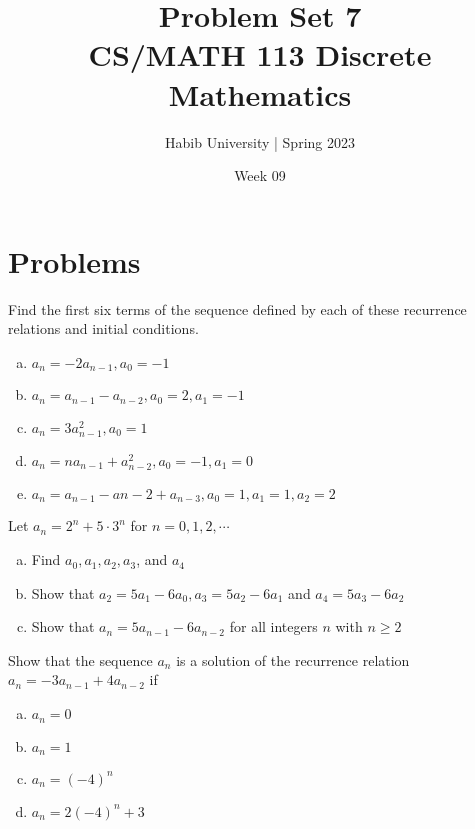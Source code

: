 \documentclass{article}
\newenvironment{problem}[2][Problem]{\begin{trivlist}
\item[\hskip \labelsep {\bfseries #1}\hskip \labelsep {\bfseries #2.}]}{\end{trivlist}}
\begin{document}
\title{Problem Set 7\\CS/MATH 113 Discrete Mathematics}
\author{Habib University | Spring 2023}
\date{Week 09}
\maketitle

\section{Problems}

\begin{problem}{1}[Chapter 2.4, Question 10 ]
    Find the first six terms of the sequence defined by each of these recurrence relations and initial conditions.
    \begin{enumerate}[(a)]
        \item $a_n = -2a_{n-1}, a_0 = -1 $
        \item $ a_n = a_{n-1} - a_{n-2}, a_0 = 2, a_1 = -1$
        \item $a_n = 3a_{n-1}^{2}, a_0 = 1 $
        \item $a_n = na_{n-1} + a_{n-2}^2, a_0 = -1, a_1 = 0 $
        \item $a_n = a_{n-1} - a{n-2} + a_{n-3}, a_0 = 1, a_1 = 1, a_2 = 2 $
    \end{enumerate}
    
\end{problem}


\begin{problem}{2}[Chapter 2.4, Question 11]
    Let $a_n = 2^n  + 5 \cdot 3^n $ for $ n = 0,1,2,\cdots$
    \begin{enumerate}[(a)]
        \item Find $a_0,a_1,a_2,a_3$, and $a_4$
        \item Show that $a_2 = 5a_1 - 6a_0, a_3  = 5a_2  - 6a_1$ and $a_4 = 5a_3 - 6a_2$
        \item Show that $a_n = 5a_{n-1} - 6a_{n-2}$ for all integers $n$ with $ n \geq 2$
    \end{enumerate}
    
\end{problem}

\begin{problem}{3}[Chapter 2.4, Question 12]
    Show that the sequence ${a_n}$ is a solution of the recurrence relation $a_n = -3a_{n-1} + 4a_{n-2}$ if 
    \begin{enumerate}[(a)]
        \item $a_n = 0 $
        \item $a_n = 1$
        \item $a_n = (-4)^n $
        \item $a_n = 2(-4)^n + 3 $
    \end{enumerate}

    
\end{problem}
\end{document}
